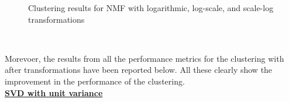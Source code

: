 \documentclass{article}
\begin{document}
\begin{figure}[!ht]%
	\centering
		\qquad		
		\qquad		
		
		\vspace*{-3mm}
	\caption{Clustering results for NMF with logarithmic, log-scale, and scale-log transformations}
	\label{fig:nmf_transform}
\end{figure}
\\  \vspace{20pt}


Morevoer, the results from all the performance metrics for the clustering with after transformations have been reported below. All these clearly show the improvement in the performance of the clustering. \\ 

\underline{\textbf{SVD with unit variance}} 
\end{document}
